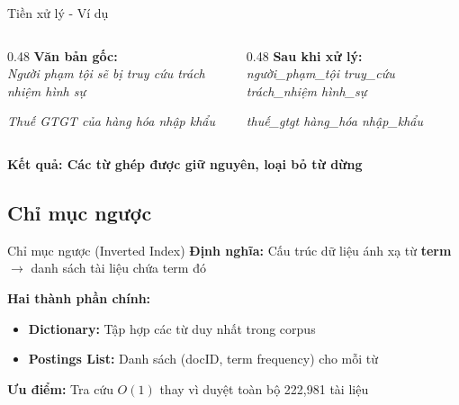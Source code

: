 \documentclass[serif, aspectratio=169]{beamer}
\newcommand{\green}[1]{\textbf{\color{codegreen}#1}}
\begin{document}
\begin{frame}{Tiền xử lý - Ví dụ}
\begin{columns}
\begin{column}{0.48\textwidth}
\textbf{Văn bản gốc:}\\
\textit{Người phạm tội sẽ bị truy cứu trách nhiệm hình sự}

\vspace{0.5cm}
\textit{Thuế GTGT của hàng hóa nhập khẩu}
\end{column}
\begin{column}{0.48\textwidth}
\textbf{Sau khi xử lý:}\\
\textit{người\_phạm\_tội truy\_cứu trách\_nhiệm hình\_sự}

\vspace{0.5cm}
\textit{thuế\_gtgt hàng\_hóa nhập\_khẩu}
\end{column}
\end{columns}

\vspace{0.5cm}
\green{Kết quả: Các từ ghép được giữ nguyên, loại bỏ từ dừng}
\end{frame}

\subsection{Chỉ mục ngược}
\begin{frame}{Chỉ mục ngược (Inverted Index)}
\textbf{Định nghĩa:} Cấu trúc dữ liệu ánh xạ từ \textbf{term} $\rightarrow$ danh sách tài liệu chứa term đó

\vspace{0.3cm}
\textbf{Hai thành phần chính:}
\begin{itemize}
    \item \textbf{Dictionary:} Tập hợp các từ duy nhất trong corpus
    \item \textbf{Postings List:} Danh sách (docID, term frequency) cho mỗi từ
\end{itemize}

\vspace{0.3cm}
\textbf{Ưu điểm:} Tra cứu $O(1)$ thay vì duyệt toàn bộ 222,981 tài liệu
\end{frame}
\end{document}
